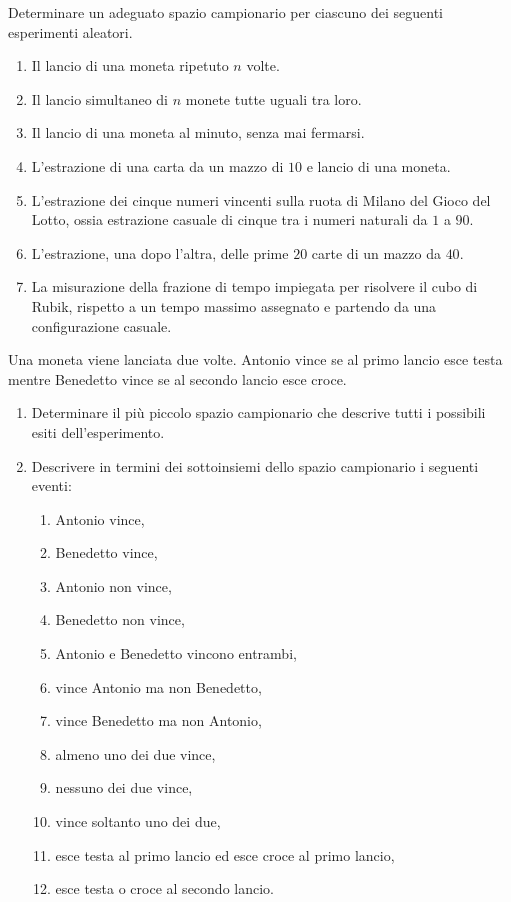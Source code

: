 
\ParteEsercizi

\Esercizio{}

Determinare un adeguato spazio campionario per ciascuno dei seguenti esperimenti aleatori.
\begin{enumerate}
	\item Il lancio di una moneta ripetuto $n$ volte.
	\item Il lancio simultaneo di $n$ monete tutte uguali tra loro.
	\item Il lancio di una moneta al minuto, senza mai fermarsi.
	\item L'estrazione di una carta da un mazzo di $10$ e lancio di una moneta.
	\item L'estrazione dei cinque numeri vincenti sulla ruota di Milano del Gioco del Lotto, ossia estrazione casuale di cinque tra i numeri naturali da $1$ a $90$.
	\item L'estrazione, una dopo l'altra, delle prime $20$ carte di un mazzo da $40$.
	\item La misurazione della frazione di tempo impiegata per risolvere il cubo di Rubik, rispetto a un tempo massimo assegnato e partendo da una configurazione casuale.
\end{enumerate}

\Esercizio{}

Una moneta viene lanciata due volte. Antonio vince se al primo lancio esce testa mentre Benedetto vince se al secondo lancio esce croce.
\begin{enumerate}
	\item Determinare il più piccolo spazio campionario che descrive tutti i possibili esiti dell'esperimento.
	\item Descrivere in termini dei sottoinsiemi dello spazio campionario i seguenti eventi:
	\begin{enumerate}
		\item Antonio vince,
		\item Benedetto vince,
		\item Antonio non vince,
		\item Benedetto non vince,
		\item Antonio e Benedetto vincono entrambi,
		\item vince Antonio ma non Benedetto,
		\item vince Benedetto ma non Antonio,
		\item almeno uno dei due vince,
		\item nessuno dei due vince,
		\item vince soltanto uno dei due,
		\item esce testa al primo lancio ed esce croce al primo lancio,
		\item esce testa o croce al secondo lancio.
	\end{enumerate}
\end{enumerate}

